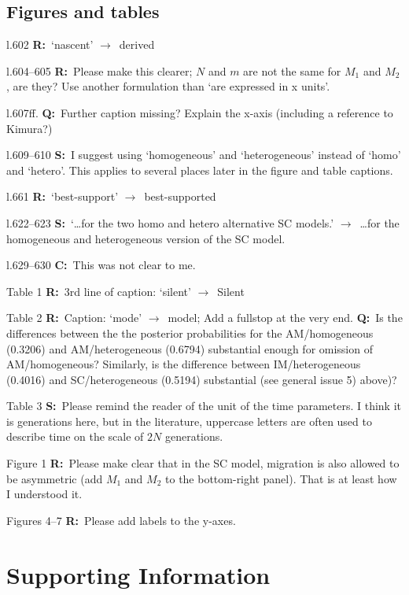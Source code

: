 \documentclass[11pt]{article}
\newenvironment{my_description}
{\begin{description}
  \setlength{\itemsep}{2pt}
  \setlength{\parskip}{0pt}
  \setlength{\parsep}{0pt}}
{\end{description}}
\newcommand{\ra}{$\rightarrow$\ }
\newcommand{\C}{\textbf{C:}\ }
\newcommand{\Q}{\textbf{Q:}\ }
\newcommand{\R}{\textbf{R:}\ }
\newcommand{\V}{\textbf{S:}\ }
\begin{document}
\subsection{Figures and tables}
\begin{my_description}
	\item[l.602] \R `nascent' \ra derived
	\item[l.604--605] \R Please make this clearer; $N$ and $m$ are not the same for $M_1$ and $M_2$, are they? Use another formulation than `are expressed in x units'.
	\item[l.607ff.] \Q Further caption missing? Explain the x-axis (including a reference to Kimura?)
	\item[l.609--610] \V I suggest using `homogeneous' and `heterogeneous' instead of `homo' and `hetero'. This applies to several places later in the figure and table captions.
	\item[l.661] \R `best-support' \ra best-supported
	\item[l.622--623] \V `\dots for the two homo and hetero alternative SC models.' \ra \dots for the homogeneous and heterogeneous version of the SC model.
	\item[l.629--630] \C This was not clear to me.
	\item[Table 1] \R 3rd line of caption: `silent' \ra Silent
	\item[Table 2] \R Caption: `mode' \ra model; Add a fullstop at the very end. \Q Is the differences between the the posterior probabilities for the AM/homogeneous (0.3206) and AM/heterogeneous (0.6794) substantial enough for omission of AM/homogeneous? Similarly, is the difference between IM/heterogeneous (0.4016) and SC/heterogeneous (0.5194) substantial (see general issue 5) above)?
	\item[Table 3] \V Please remind the reader of the unit of the time parameters. I think it is generations here, but in the literature, uppercase letters are often used to describe time on the scale of $2N$ generations.
	\item[Figure 1] \R Please make clear that in the SC model, migration is also allowed to be asymmetric (add $M_1$ and $M_2$ to the bottom-right panel). That is at least how I understood it.
	\item[Figures 4--7] \R Please add labels to the y-axes.
\end{my_description}


\section{Supporting Information}
\end{document}
